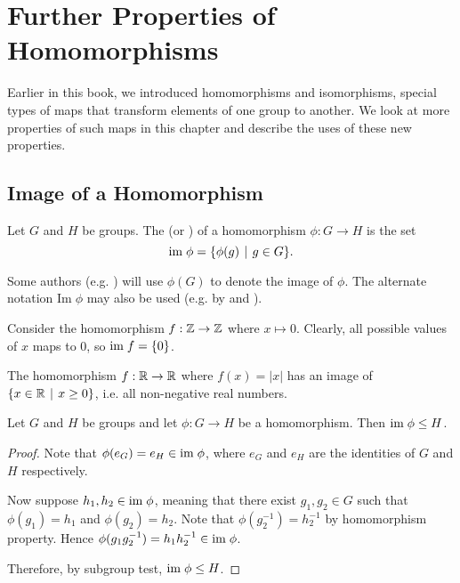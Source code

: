 \chapter{Further Properties of Homomorphisms}
Earlier in this book, we introduced homomorphisms and isomorphisms, special types of maps that transform elements of one group to another. We look at more properties of such maps in this chapter and describe the uses of these new properties.

\section{Image of a Homomorphism}
\begin{definition}
    Let $G$ and $H$ be groups. The  (or ) of a homomorphism $\phi: G \to H$ is the set
    \[
        \im\phi = \{\phi(g) \vert g \in G\}.
    \]
\end{definition}
\begin{remark}
    Some authors (e.g. \cite[p.~6]{judson_beezer_2022}) will use $\phi(G)$ to denote the image of $\phi$. The alternate notation $\mathrm{Im}\;\phi$ may also be used (e.g. by \cite[Definition I.2.2]{hungerford_1980} and \cite[\S 66]{clark_1984}).
\end{remark}

\begin{example}
    Consider the homomorphism $f: \mathbb{Z} \to \mathbb{Z}$ where $x \mapsto 0$. Clearly, all possible values of $x$ maps to 0, so $\mathrm{im}\; f = \{0\}$.
\end{example}

\begin{example}
    The homomorphism $f: \mathbb{R} \to \mathbb{R}$ where $f(x) = |x|$ has an image of $\{x \in \R \vert x \geq 0\}$, i.e. all non-negative real numbers.
\end{example}

\begin{proposition}\label{prop-image-is-subgroup-of-codomain}
    Let $G$ and $H$ be groups and let $\phi: G \to H$ be a homomorphism. Then $\mathrm{im}\;\phi \leq H$.
\end{proposition}
\begin{proof}
    Note that $\phi(e_G) = e_H \in \mathrm{im}\;\phi$, where $e_G$ and $e_H$ are the identities of $G$ and $H$ respectively.

    Now suppose $h_1, h_2 \in \mathrm{im}\;\phi$, meaning that there exist $g_1, g_2 \in G$ such that $\phi(g_1) = h_1$ and $\phi(g_2) = h_2$. Note that $\phi(g_2^{-1}) = h_2^{-1}$ by homomorphism property. Hence $\phi(g_1g_2^{-1}) = h_1h_2^{-1} \in \mathrm{im}\;\phi$.

    Therefore, by subgroup test, $\mathrm{im}\;\phi \leq H$.
\end{proof}

